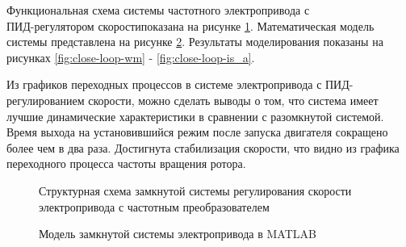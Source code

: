         Функциональная схема системы частотного электропривода с\\
        ПИД-регулятором скоростипоказана на рисунке \ref{fig:struct-new}.
        Математическая модель системы представлена на 
        рисунке \ref{fig:close-loop-model}. Результаты моделирования показаны на рисунках
        \ref{fig:close-loop-wm} - \ref{fig:close-loop-is_a}.

        Из графиков переходных процессов в системе электропривода с
        ПИД-регулированием скорости, можно сделать выводы о том, что система
        имеет лучшие динамические характеристики в сравнении с разомкнутой
        системой. Время выхода на установившийся режим после запуска двигателя
        сокращено более чем в два раза. Достигнута стабилизация скорости, что
        видно из графика переходного процесса частоты вращения   ротора.
        
        \begin{figure}[h!]
            \caption{Структурная схема замкнутой системы регулирования скорости
                электропривода с частотным преобразователем}
            \label{fig:struct-new}
        \end{figure}

        \begin{figure}
            \caption{Модель замкнутой системы электропривода в MATLAB}
            \label{fig:close-loop-model}
        \end{figure}
        
